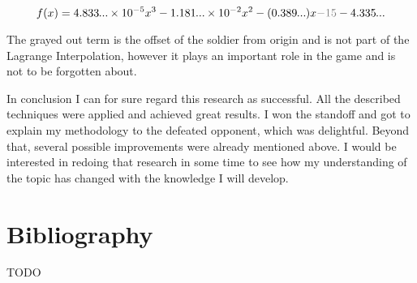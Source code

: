 \documentclass[12pt, titlepage]{article}
\newcommand{\TODO}{\begin{center}\color{red}TODO\end{center}}
\begin{document}
\newcommand\smalldots{\makebox[0.75em][c]{.\hfil.\hfil.}}

$$f(x) = 4.833\smalldots \times 10^{-5} x^3- 1.181\smalldots{} \times 10^{-2} x^2 - (0.389\smalldots{}) x \textcolor{gray}{- 15} - 4.335\smalldots$$

The grayed out term is the offset of the soldier from origin and is not part of the
Lagrange Interpolation, however it plays an important role in the game and 
is not to be forgotten about.

In conclusion I can for sure regard this research as successful. All the
described techniques were applied and achieved great results. I won the
standoff and got to explain my methodology to the defeated opponent, which
was delightful. Beyond that, several possible improvements were already 
mentioned above. I would be interested in redoing that research in some time
to see how my understanding of the topic has changed with the knowledge I will
develop.

\section{Bibliography}
\appendix
\TODO
\end{document}
